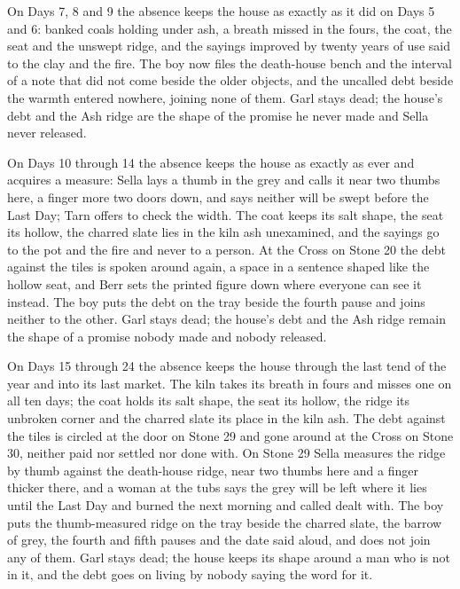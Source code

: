 \documentclass{design/chronicle}
\begin{document}
{On Days 7, 8 and 9 the absence keeps the house as exactly as it did on Days 5 and 6: banked coals holding under ash, a breath missed in the fours, the coat, the seat and the unswept ridge, and the sayings improved by twenty years of use said to the clay and the fire. The boy now files the death-house bench and the interval of a note that did not come beside the older objects, and the uncalled debt beside the warmth entered nowhere, joining none of them. Garl stays dead; the house’s debt and the Ash ridge are the shape of the promise he never made and Sella never released.

On Days 10 through 14 the absence keeps the house as exactly as ever and acquires a measure: Sella lays a thumb in the grey and calls it near two thumbs here, a finger more two doors down, and says neither will be swept before the Last Day; Tarn offers to check the width. The coat keeps its salt shape, the seat its hollow, the charred slate lies in the kiln ash unexamined, and the sayings go to the pot and the fire and never to a person. At the Cross on Stone 20 the debt against the tiles is spoken around again, a space in a sentence shaped like the hollow seat, and Berr sets the printed figure down where everyone can see it instead. The boy puts the debt on the tray beside the fourth pause and joins neither to the other. Garl stays dead; the house’s debt and the Ash ridge remain the shape of a promise nobody made and nobody released.

On Days 15 through 24 the absence keeps the house through the last tend of the year and into its last market. The kiln takes its breath in fours and misses one on all ten days; the coat holds its salt shape, the seat its hollow, the ridge its unbroken corner and the charred slate its place in the kiln ash. The debt against the tiles is circled at the door on Stone 29 and gone around at the Cross on Stone 30, neither paid nor settled nor done with. On Stone 29 Sella measures the ridge by thumb against the death-house ridge, near two thumbs here and a finger thicker there, and a woman at the tubs says the grey will be left where it lies until the Last Day and burned the next morning and called dealt with. The boy puts the thumb-measured ridge on the tray beside the charred slate, the barrow of grey, the fourth and fifth pauses and the date said aloud, and does not join any of them. Garl stays dead; the house keeps its shape around a man who is not in it, and the debt goes on living by nobody saying the word for it.

}
\end{document}
